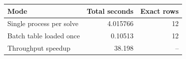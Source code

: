 {\small
\begin{tabular}{lrr}
\hline
Mode & Total seconds & Exact rows \\
\hline
Single process per solve & 4.015766 & 12 \\
Batch table loaded once & 0.10513 & 12 \\
Throughput speedup & 38.198 & -- \\
\hline
\end{tabular}
}
